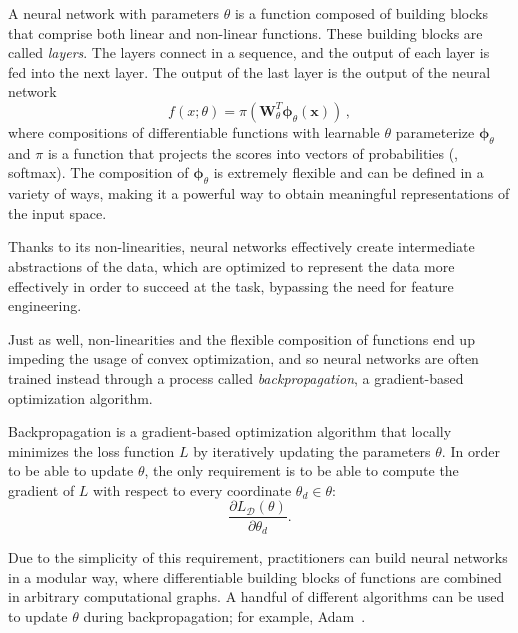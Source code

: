 \begin{definition}
    A neural network with parameters $\theta$ is a function
    composed of building blocks that comprise both linear and non-linear
    functions. These building blocks are called \textit{layers}.
    The layers connect in a sequence, and the output of each
    layer is fed into the next layer. The output of the last layer is
    the output of the neural network
    \begin{equation}
        f(x; \theta) = \pi 
        \left(\bm{W}_{\theta}^T\bm{\phi}_{\theta}\left(\bm{x}\right)\right)\,,
    \end{equation}
    where compositions of differentiable functions with learnable
    $\theta$ parameterize $\bm{\phi}_{\theta}$ and $\pi$ is a
    function that projects the scores into vectors of probabilities (\eg, softmax).
    The composition of $\bm{\phi}_{\theta}$ is extremely flexible and
    can be defined in a variety of ways, making it a powerful way to
    obtain meaningful representations of the input space.
\end{definition}
%
Thanks to its non-linearities, neural networks effectively create
intermediate abstractions of the data, which are optimized to represent the data
more effectively in order to succeed at the task, bypassing the need
for feature engineering.

Just as well, non-linearities and the flexible composition of functions end up
impeding the usage of convex optimization, and so neural networks are
often trained instead through a process called
\textit{backpropagation}, a gradient-based optimization algorithm.

\begin{definition}[backpropagation]
    Backpropagation is a gradient-based optimization algorithm that
    locally minimizes the loss function $L$ by iteratively updating the
    parameters $\theta$. In order to be able to update $\theta$,
    the only requirement is to be able to compute the gradient of
    $L$ with respect to every coordinate $\theta_d\in\theta$:
    \begin{equation}
        \frac{\partial L_{\mathcal{D}}(\theta)}{\partial \theta_d}.
        \label{eq:backprop}
    \end{equation}
\end{definition}

Due to the simplicity of this requirement, practitioners can build
neural networks in a modular way, where differentiable building
blocks of functions are combined in arbitrary computational graphs. A
handful of different algorithms can be used to update $\theta$ during
backpropagation; for example, Adam~\citep{kingma2014adam}.

